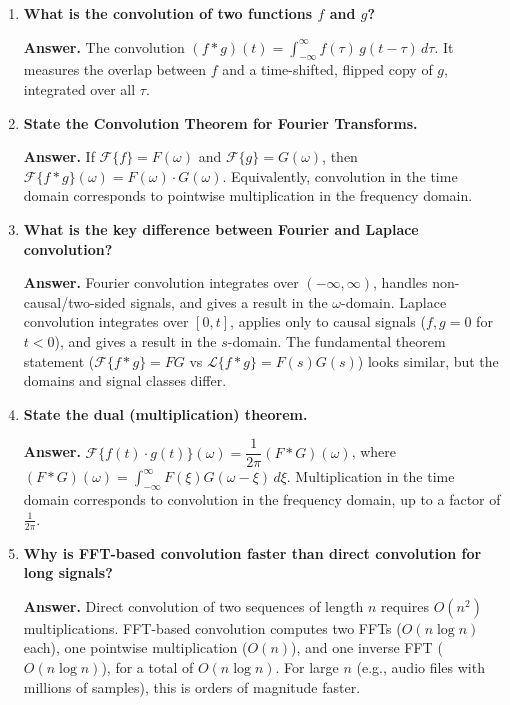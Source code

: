 \documentclass[12pt,a4paper]{article}
\begin{document}
\begin{enumerate}[label=\textbf{Q\arabic*.}, leftmargin=*, itemsep=10pt]

\item \textbf{What is the convolution of two functions $f$ and $g$?}

  \textbf{Answer.} The convolution $(f*g)(t) = \int_{-\infty}^{\infty}
  f(\tau)\,g(t-\tau)\,d\tau$. It measures the overlap between $f$ and a
  time-shifted, flipped copy of $g$, integrated over all $\tau$.

\item \textbf{State the Convolution Theorem for Fourier Transforms.}

  \textbf{Answer.} If $\mathcal{F}\{f\} = F(\omega)$ and $\mathcal{F}\{g\} =
  G(\omega)$, then $\mathcal{F}\{f*g\}(\omega) = F(\omega)\cdot G(\omega)$.
  Equivalently, convolution in the time domain corresponds to pointwise
  multiplication in the frequency domain.

\item \textbf{What is the key difference between Fourier and Laplace convolution?}

  \textbf{Answer.} Fourier convolution integrates over $(-\infty,\infty)$,
  handles non-causal/two-sided signals, and gives a result in the
  $\omega$-domain. Laplace convolution integrates over $[0,t]$, applies only
  to causal signals ($f,g = 0$ for $t<0$), and gives a result in the
  $s$-domain. The fundamental theorem statement ($\mathcal{F}\{f*g\} = FG$
  vs $\mathcal{L}\{f*g\} = F(s)G(s)$) looks similar, but the domains and
  signal classes differ.

\item \textbf{State the dual (multiplication) theorem.}

  \textbf{Answer.} $\mathcal{F}\{f(t)\cdot g(t)\}(\omega) =
  \dfrac{1}{2\pi}(F*G)(\omega)$, where $(F*G)(\omega) =
  \int_{-\infty}^{\infty}F(\xi)G(\omega-\xi)\,d\xi$. Multiplication in the
  time domain corresponds to convolution in the frequency domain, up to a
  factor of $\frac{1}{2\pi}$.

\item \textbf{Why is FFT-based convolution faster than direct convolution for long signals?}

  \textbf{Answer.} Direct convolution of two sequences of length $n$ requires
  $O(n^2)$ multiplications. FFT-based convolution computes two FFTs
  ($O(n\log n)$ each), one pointwise multiplication ($O(n)$), and one
  inverse FFT ($O(n\log n)$), for a total of $O(n\log n)$. For large $n$
  (e.g., audio files with millions of samples), this is orders of magnitude
  faster.


\end{enumerate}
\end{document}
